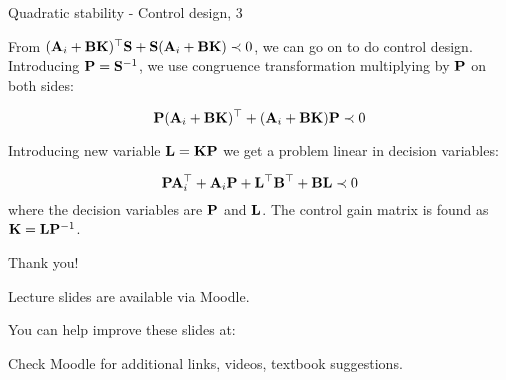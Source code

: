 \documentclass{beamer}
\begin{document}
	
	
	\begin{frame}{Quadratic stability - Control design, 3}
		\begin{flushleft}
			
			From $(\mathbf{A}_i + \mathbf{B}\mathbf{K})^\top \mathbf{S} +
			\mathbf{S} (\mathbf{A}_i + \mathbf{B}\mathbf{K}) \prec 0$, we can go on to do control design. Introducing $\mathbf{P} = \mathbf{S}^{-1}$, we use congruence transformation multiplying by $\mathbf{P}$ on both sides:
			
			\begin{equation}
				\mathbf{P}(\mathbf{A}_i + \mathbf{B}\mathbf{K})^\top  +
				(\mathbf{A}_i + \mathbf{B}\mathbf{K})\mathbf{P} \prec 0
			\end{equation}
			
			Introducing new variable $\mathbf{L} = \mathbf{K} \mathbf{P}$ we get a problem linear in decision variables:
			
			\begin{equation}
				\mathbf{P}\mathbf{A}_i^\top + \mathbf{A}_i \mathbf{P} +
				\mathbf{L}^\top\mathbf{B}^\top + \mathbf{B}\mathbf{L} \prec 0
			\end{equation}		
			where the decision variables are $\mathbf{P}$ and $\mathbf{L}$. The control gain matrix is found as $\mathbf{K} = \mathbf{L} \mathbf{P}^{-1}$.
			
		\end{flushleft}
	\end{frame}
	
	
	
	\begin{frame}{Thank you!}
		\centerline{Lecture slides are available via Moodle.}
		\bigskip
		\centerline{You can help improve these slides at:}
		\centerline{\mygit}
		\bigskip
		\centerline{Check Moodle for additional links, videos, textbook suggestions.}
		\bigskip
		
		\centerline{\textcolor{black}{}}
	\end{frame}
	
	
	
\end{document}
